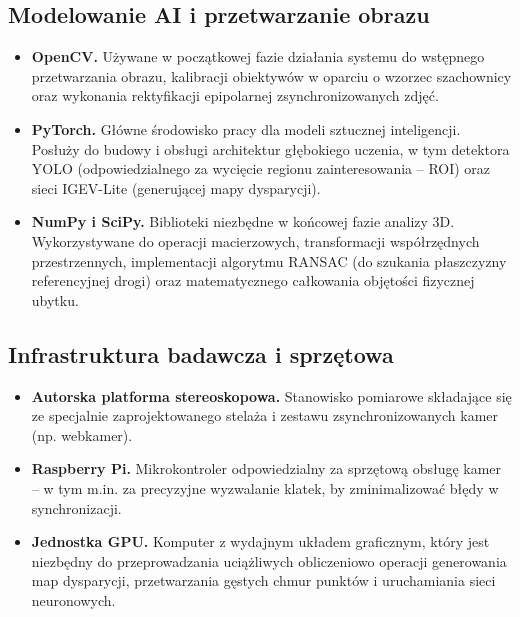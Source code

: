 \documentclass[11pt, a4paper]{article}
\begin{document}
\subsection{Modelowanie AI i przetwarzanie obrazu}
\begin{itemize}
    \item \textbf{OpenCV.} Używane w początkowej fazie działania systemu do wstępnego przetwarzania obrazu, kalibracji obiektywów w oparciu o wzorzec szachownicy oraz wykonania rektyfikacji epipolarnej zsynchronizowanych zdjęć.
    \item \textbf{PyTorch.} Główne środowisko pracy dla modeli sztucznej inteligencji. Posłuży do budowy i obsługi architektur głębokiego uczenia, w tym detektora YOLO (odpowiedzialnego za wycięcie regionu zainteresowania – ROI) oraz sieci IGEV-Lite (generującej mapy dysparycji).
    \item \textbf{NumPy i SciPy.} Biblioteki niezbędne w końcowej fazie analizy 3D. Wykorzystywane do operacji macierzowych, transformacji współrzędnych przestrzennych, implementacji algorytmu RANSAC (do szukania płaszczyzny referencyjnej drogi) oraz matematycznego całkowania objętości fizycznej ubytku.
\end{itemize}

\subsection{Infrastruktura badawcza i sprzętowa}
\begin{itemize}
    \item \textbf{Autorska platforma stereoskopowa.} Stanowisko pomiarowe składające się ze specjalnie zaprojektowanego stelaża i zestawu zsynchronizowanych kamer (np. webkamer).
    \item \textbf{Raspberry Pi.} Mikrokontroler odpowiedzialny za sprzętową obsługę kamer – w tym m.in. za precyzyjne wyzwalanie klatek, by zminimalizować błędy w synchronizacji.
    \item \textbf{Jednostka GPU.} Komputer z wydajnym układem graficznym, który jest niezbędny do przeprowadzania uciążliwych obliczeniowo operacji generowania map dysparycji, przetwarzania gęstych chmur punktów i uruchamiania sieci neuronowych.
\end{itemize}
\end{document}
